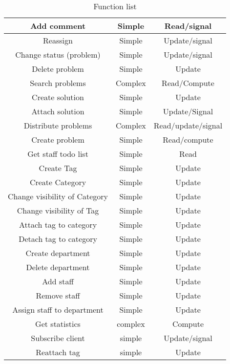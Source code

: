 \begin{table}[h]
\begin{center}
\begin{tabular}{|c|c|c|}
\hline
Add comment &   Simple & Read/signal   \\ \hline%
Reassign & Simple   & Update/signal \\ \hline%
Change status (problem) &   Simple & Update/signal \\ \hline%
Delete problem & Simple &   Update \\   \hline%
Search problems & Complex &   Read/Compute \\ \hline%
Create solution & Simple &   Update \\   \hline%
Attach solution & Simple &   Update/Signal \\   \hline%
Distribute problems &   Complex & Read/update/signal \\   \hline%
Create problem &   Simple & Read/compute \\   \hline%
Get staff todo list & Simple & Read \\   \hline%
Create Tag & Simple &   Update \\ \hline%
Create Category & Simple & Update \\ \hline%
Change visibility of Category &   Simple &   Update \\   \hline%
Change visibility of Tag &   Simple &  Update \\ \hline%
Attach tag to category & Simple & Update \\ \hline%
Detach tag to category & Simple & Update \\ \hline%
Create department & Simple & Update \\ \hline%
Delete department & Simple & Update \\ \hline%
Add staff & Simple & Update \\ \hline%
Remove staff & Simple & Update \\ \hline%
Assign staff to department & Simple & Update \\ \hline%
Get statistics & complex & Compute \\ \hline%
Subscribe client & simple & Update/signal \\ \hline%
Reattach tag & simple & Update \\ \hline%



\end{tabular}
\end{center}
\caption{Function list}
\label{tab:functionlist}
\end{table}

